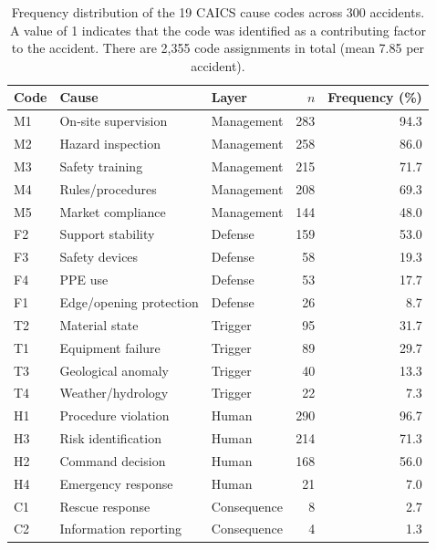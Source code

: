 \begin{table}[htbp]
\centering
\caption{Frequency distribution of the 19 CAICS cause codes across 300 accidents. A value of 1 indicates that the code was identified as a contributing factor to the accident. There are 2,355 code assignments in total (mean 7.85 per accident).}
\label{tab:caics_cause_distribution}
\begin{tabular}{@{}lllrr@{}}
\toprule
Code & Cause & Layer & $n$ & Frequency (\%) \\
\midrule
M1 & On-site supervision & Management & 283 & 94.3 \\
M2 & Hazard inspection & Management & 258 & 86.0 \\
M3 & Safety training & Management & 215 & 71.7 \\
M4 & Rules/procedures & Management & 208 & 69.3 \\
M5 & Market compliance & Management & 144 & 48.0 \\
\addlinespace
F2 & Support stability & Defense & 159 & 53.0 \\
F3 & Safety devices & Defense & 58 & 19.3 \\
F4 & PPE use & Defense & 53 & 17.7 \\
F1 & Edge/opening protection & Defense & 26 & 8.7 \\
\addlinespace
T2 & Material state & Trigger & 95 & 31.7 \\
T1 & Equipment failure & Trigger & 89 & 29.7 \\
T3 & Geological anomaly & Trigger & 40 & 13.3 \\
T4 & Weather/hydrology & Trigger & 22 & 7.3 \\
\addlinespace
H1 & Procedure violation & Human & 290 & 96.7 \\
H3 & Risk identification & Human & 214 & 71.3 \\
H2 & Command decision & Human & 168 & 56.0 \\
H4 & Emergency response & Human & 21 & 7.0 \\
\addlinespace
C1 & Rescue response & Consequence & 8 & 2.7 \\
C2 & Information reporting & Consequence & 4 & 1.3 \\
\bottomrule
\end{tabular}
\end{table}
